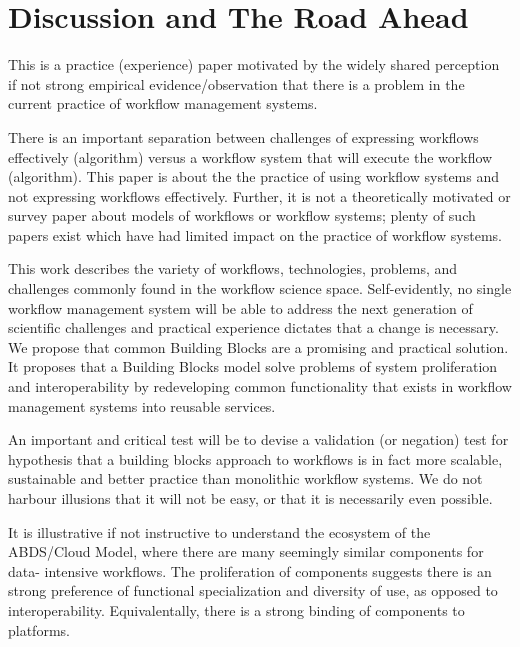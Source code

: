 \section{Discussion and The Road Ahead}\label{discussion}

This is a practice (experience) paper motivated by the widely shared
perception if not strong empirical evidence/observation  that  there is a
problem in the current practice of workflow management systems.

There is an important separation between challenges of expressing workflows
effectively (algorithm) versus a workflow system that will execute the
workflow (algorithm). This paper is about the  the practice of using workflow
systems and not expressing workflows effectively. Further, it is not a
theoretically motivated or survey paper about models of workflows or workflow
systems; plenty of such papers exist which have had limited impact on the
practice of workflow systems. 

This work describes the variety of workflows, technologies, problems, and
challenges commonly found in the workflow science space.  Self-evidently, no
single workflow management system will be able to address the next generation
of scientific challenges and practical experience dictates that a change is
necessary. We propose  that common Building Blocks are a promising and
practical solution. It proposes that a Building Blocks model solve problems of
system proliferation and interoperability by redeveloping common functionality
that exists in workflow management systems into reusable services.

An important and critical test will be to devise a validation (or negation)
test for hypothesis that a building blocks approach to workflows is in fact
more scalable, sustainable and better practice than monolithic workflow
systems. We do not harbour illusions that it will not be easy, or that it is
necessarily even possible.

It is illustrative if not instructive to understand the ecosystem of the
ABDS/Cloud Model, where there are many seemingly similar components for  data-
intensive workflows. The proliferation of components suggests there is an
strong preference of functional specialization and diversity of use, as
opposed to interoperability.  Equivalentally, there is a strong binding of
components to platforms.

